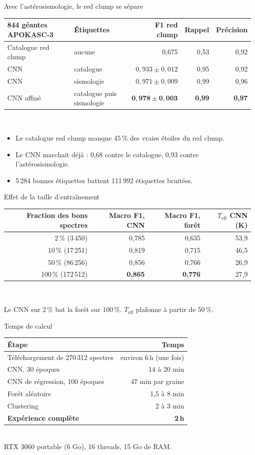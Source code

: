 \documentclass[aspectratio=169,11pt]{beamer}
\newcommand{\teff}{$T_{\mathrm{eff}}$}
\begin{document}
\begin{frame}{Avec l'astérosismologie, le red clump se sépare}
\centering
\small
\begin{tabular}{llrrr}
\toprule
844 géantes APOKASC-3 & Étiquettes & F1 red clump & Rappel & Précision \\
\midrule
Catalogue red clump & aucune & 0,675 & 0,53 & 0,92 \\
CNN & catalogue & $0{,}933 \pm 0{,}012$ & 0,95 & 0,92 \\
CNN & sismologie & $0{,}971 \pm 0{,}009$ & 0,99 & 0,96 \\
CNN affiné & catalogue puis sismologie & $\mathbf{0{,}978 \pm 0{,}003}$ & \textbf{0,99} & \textbf{0,97} \\
\bottomrule
\end{tabular}\\[1em]
\raggedright
\begin{itemize}
  \item Le catalogue red clump manque \alert{45\,\%} des vraies étoiles du red clump.
  \item Le CNN marchait déjà : 0,68 contre le catalogue, 0,93 contre l'astérosismologie.
  \item 5\,284 bonnes étiquettes battent 111\,992 étiquettes bruitées.
\end{itemize}
\end{frame}

\begin{frame}{Effet de la taille d'entraînement}
\centering
\begin{tabular}{rrrr}
\toprule
Fraction des bons spectres & Macro F1, CNN & Macro F1, forêt & \teff{} CNN (K) \\
\midrule
2\,\% (3\,450) & 0,785 & 0,635 & 53,9 \\
10\,\% (17\,251) & 0,819 & 0,715 & 46,5 \\
50\,\% (86\,256) & 0,856 & 0,766 & 26,9 \\
100\,\% (172\,512) & \textbf{0,865} & \textbf{0,776} & 27,9 \\
\bottomrule
\end{tabular}\\[1em]
\raggedright
Le CNN sur 2\,\% bat la forêt sur 100\,\%. \teff{} plafonne à partir de 50\,\%.
\end{frame}

\begin{frame}{Temps de calcul}
\centering
\begin{tabular}{lr}
\toprule
Étape & Temps \\
\midrule
Téléchargement de 270\,312 spectres & environ 6\,h (une fois) \\
CNN, 30 époques & 14 à 20 min \\
CNN de régression, 100 époques & 47 min par graine \\
Forêt aléatoire & 1,5 à 8 min \\
Clustering & 2 à 3 min \\
\midrule
\textbf{Expérience complète} & \textbf{2\,h} \\
\bottomrule
\end{tabular}\\[1em]
RTX 3060 portable (6 Go), 16 threads, 15 Go de RAM.
\end{frame}
\end{document}
